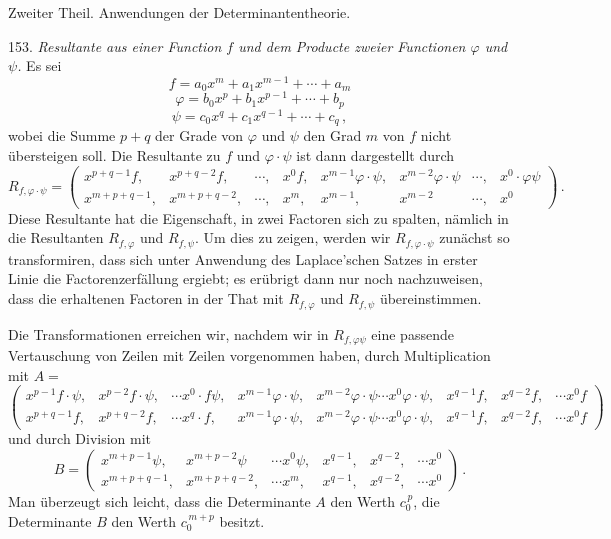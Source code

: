 \documentclass[11pt]{article}
\providecommand{\weberpage}[1]{}
\begin{document}
\weberpage{162}
Zweiter Theil. Anwendungen der Determinantentheorie.

153. \textit{Resultante aus einer Function $f$ und dem Producte zweier
Functionen $\varphi$ und $\psi$.} Es sei
\[
f = a_0 x^m + a_1 x^{m-1} + \cdots + a_m
\]
\[
\varphi = b_0 x^p + b_1 x^{p-1} + \cdots + b_p
\]
\[
\psi = c_0 x^q + c_1 x^{q-1} + \cdots + c_q\,,
\]
wobei die Summe $p+q$ der Grade von $\varphi$ und $\psi$ den Grad $m$
von $f$ nicht \"ubersteigen soll. Die Resultante zu $f$ und
$\varphi \cdot \psi$ ist dann dargestellt durch
\[
R_{f,\varphi\cdot\psi} =
\begin{pmatrix}
x^{p+q-1}f, & x^{p+q-2}f, & \cdots, & x^0f, & x^{m-1}\varphi\cdot\psi, & x^{m-2}\varphi\cdot\psi & \cdots, & x^0\cdot\varphi\psi \\
x^{m+p+q-1}, & x^{m+p+q-2}, & \cdots, & x^m, & x^{m-1}, & x^{m-2} & \cdots, & x^0
\end{pmatrix}\,.
\]
Diese Resultante hat die Eigenschaft, in zwei Factoren sich zu
spalten, n\"amlich in die Resultanten $R_{f,\varphi}$ und $R_{f,\psi}$.
Um dies zu zeigen, werden wir $R_{f,\varphi\cdot\psi}$ zun\"achst so
transformiren, dass sich unter Anwendung des Laplace'schen Satzes in
erster Linie die Factorenzerf\"allung ergiebt; es er\"ubrigt dann nur
noch nachzuweisen, dass die erhaltenen Factoren in der That mit
$R_{f,\varphi}$ und $R_{f,\psi}$ \"ubereinstimmen.

Die Transformationen erreichen wir, nachdem wir in $R_{f,\varphi\psi}$
eine passende Vertauschung von Zeilen mit Zeilen vorgenommen haben,
durch Multiplication mit $A =$
\[
\begin{pmatrix}
x^{p-1}f\cdot\psi, & x^{p-2}f\cdot\psi, & \cdots x^0\cdot f\psi, & x^{m-1}\varphi\cdot\psi, & x^{m-2}\varphi\cdot\psi \cdots x^0\varphi\cdot\psi, & x^{q-1}f, & x^{q-2}f, & \cdots x^0f \\
x^{p+q-1}f, & x^{p+q-2}f, & \cdots x^q\cdot f, & x^{m-1}\varphi\cdot\psi, & x^{m-2}\varphi\cdot\psi \cdots x^0\varphi\cdot\psi, & x^{q-1}f, & x^{q-2}f, & \cdots x^0f
\end{pmatrix}
\]
und durch Division mit
\[
B =
\begin{pmatrix}
x^{m+p-1}\psi, & x^{m+p-2}\psi & \cdots x^0\psi, & x^{q-1}, & x^{q-2}, & \cdots x^0 \\
x^{m+p+q-1}, & x^{m+p+q-2}, & \cdots x^m, & x^{q-1}, & x^{q-2}, & \cdots x^0
\end{pmatrix}\,.
\]
Man \"uberzeugt sich leicht, dass die Determinante $A$ den Werth
$c_0^{\,p}$, die Determinante $B$ den Werth $c_0^{\,m+p}$ besitzt.
\end{document}

